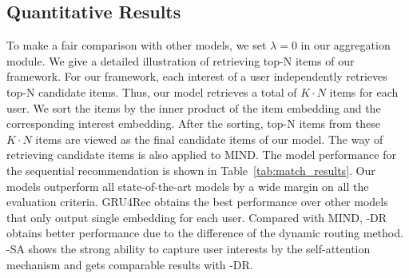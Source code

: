 \subsection{Quantitative Results}
To make a fair comparison with other models, we set $\lambda=0$ in our aggregation module. We give a detailed illustration of retrieving top-N items of our framework. For our framework, each interest of a user independently retrieves top-N candidate items. Thus, our model retrieves a total of $K\cdot N$ items for each user. We sort the items by the inner product of the item embedding and the corresponding interest embedding. After the sorting, top-N items from these $K\cdot N$ items are viewed as the final candidate items of our model. The way of retrieving candidate items is also applied to MIND. 
The model performance for the sequential recommendation is shown in Table~\ref{tab:match_results}. Our models outperform all state-of-the-art models by a wide margin on all the evaluation criteria. GRU4Rec obtains the best performance over other models that only output single embedding for each user. Compared with MIND, \model-DR obtains better performance due to the difference of the dynamic routing method. \model-SA shows the strong ability to capture user interests by the self-attention mechanism and gets comparable results with \model-DR.




